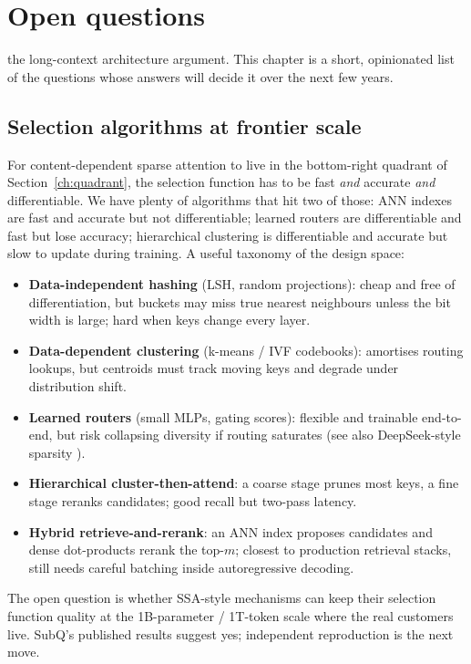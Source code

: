 \section{Open questions}
\label{ch:open}

 the long-context architecture argument. This
chapter is a short, opinionated list of the questions whose answers will
decide it over the next few years.

\subsection{Selection algorithms at frontier scale}

For content-dependent sparse attention to live in the bottom-right
quadrant of Section~\ref{ch:quadrant}, the selection function has to be
fast \emph{and} accurate \emph{and} differentiable. We have plenty of
algorithms that hit two of those: ANN indexes are fast and accurate but
not differentiable; learned routers are differentiable and fast but lose
accuracy; hierarchical clustering is differentiable and accurate but slow
to update during training. A useful taxonomy of the design space:

\begin{itemize}
\item \textbf{Data-independent hashing} (LSH, random projections): cheap
and free of differentiation, but buckets may miss true nearest neighbours
unless the bit width is large; hard when keys change every layer.
\item \textbf{Data-dependent clustering} (k-means / IVF codebooks):
amortises routing lookups, but centroids must track moving keys and
degrade under distribution shift.
\item \textbf{Learned routers} (small MLPs, gating scores): flexible and
trainable end-to-end, but risk collapsing diversity if routing
saturates (see also DeepSeek-style sparsity \citep{deepseek2024dsa}).
\item \textbf{Hierarchical cluster-then-attend}: a coarse stage prunes
most keys, a fine stage reranks candidates; good recall but two-pass
latency.
\item \textbf{Hybrid retrieve-and-rerank}: an ANN index proposes
candidates and dense dot-products rerank the top-\(m\); closest to
production retrieval stacks, still needs careful batching inside
autoregressive decoding.
\end{itemize}

The open question is whether SSA-style mechanisms can keep their
selection function quality at the 1B-parameter / 1T-token scale where the
real customers live. SubQ's published results suggest yes; independent
reproduction is the next move.


